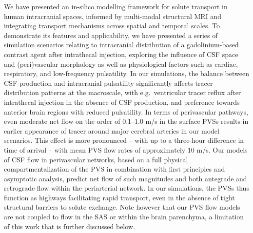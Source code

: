 \documentclass[fleqn,10pt]{wlscirep}
\begin{document}
We have presented an in-silico modelling framework for solute
transport in human intracranial spaces, informed by multi-modal
structural MRI and integrating transport mechanisms across spatial and
temporal scales. To demonstrate its features and applicability, we
have presented a series of simulation scenarios relating to
intracranial distribution of a gadolinium-based contrast agent after
intrathecal injection, exploring the influence of CSF space and
(peri)vascular morphology as well as physiological factors such as
cardiac, respiratory, and low-frequency pulsatility. In our
simulations, the balance between CSF production and intracranial
pulsatility significantly affects tracer distribution patterns at the
macroscale, with e.g.~ventricular tracer reflux after intrathecal
injection in the absence of CSF production, and preference towards
anterior brain regions with reduced pulsatility. In terms of
perivascular pathways, even moderate net flow on the order of 0.1--1.0
\textmu m/s in the surface PVSs results in earlier appearance of
tracer around major cerebral arteries in our model scenarios. This
effect is more pronounced -- with up to a three-hour difference in
time of arrival -- with mean PVS flow rates of approximately 10
\textmu m/s. Our models of CSF flow in perivascular networks, based on
a full physical compartmentalization of the PVS in combination with first principles and asymptotic analysis, predict net flow of such
magnitudes and both antegrade and retrograde flow within the
periarterial network. In our simulations, the PVSs thus function as
highways facilitating rapid transport, even in the absence of tight
structural barriers to solute exchange. Note however that our PVS 
flow models are not coupled to flow in the SAS or within the brain 
parenchyma, a limitation of this work that is further discussed below.


\end{document}
